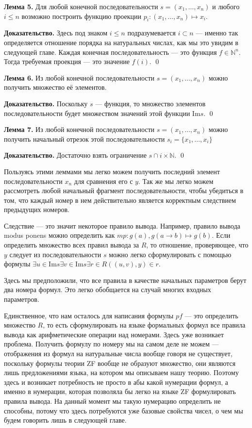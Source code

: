 {\bfseries Лемма 5.} Для любой конечной последовательности $s = (x_1, \ldots, x_n)$ и любого $i\le n$ возможно построить функцию проекции $p_i: (x_1, \dots, x_n)\mapsto x_i$.

{\bfseries Доказательство.} Здесь под знаком $i \le n$ подразумевается $i \subset n$ — именно так определяется отношение порядка на натуральных числах, как мы это увидим в следующей главе. Каждая конечная последовательность — это функция $f\in\mathbb{N}^n$. Тогда требуемая проекция — это значение $f(i)$. \qed

{\bfseries Лемма 6.} Из любой конечной последовательности $s = (x_1, \ldots, x_n)$ можно получить множество её элементов.

{\bfseries Доказательство.} Поскольку $s$ — функция, то множество элементов последовательности будет множеством значений этой функции $\mathrm{Im} s$. \qed

{\bfseries Лемма 7.} Из любой конечной последовательности $s = (x_1, \ldots, x_n)$ можно получить начальный отрезок этой последовательности $s_i = \{x_1, \ldots, x_i\}$

{\bfseries Доказательство.} Достаточно взять ограничение $s\cap i\times \mathbb{N}$. \qed

Пользуясь этими леммами мы легко можем получить последний элемент последовательности $x_n$ для сравнения его с $y$. Так же мы легко можем рассмотреть любой начальный фрагмент последовательности, чтобы убедиться в том, что каждый номер в нем действительно является корректным следствием предыдущих номеров.

Следствие — это значит некоторое правило вывода. Например, правило вывода modus ponens можно определить как $mp: g(a), g(a\rightarrow b)\mapsto g(b)$. Если определить множество всех правил вывода за $R$, то отношение, проверяющее, что $y$ следует из последовательности $s$ можно легко сформулировать с помощью формулы $\exists u\in \mathrm{Im} s \exists v \in \mathrm{Im} s \exists r\in R ((u, v), y) \in r$.

Здесь мы предположили, что все правила в качестве начальных параметров берут два номера формул. Это легко обобщается на случай многих входных параметров.

Единственное, что нам осталось для написания формулы $pf$ — это определить множество $R$, то есть сформулировать на языке формальных формул все правила вывода как арифметические операции над номерами. Здесь уже возникает проблема. Получить формулу по номеру мы на самом деле не можем — отображения из формул на натуральные числа вообще говоря не существует, поскольку формулы теории ZF вообще не образуют множество, они являются лишь предложениями языка, на котором мы описываем нашу теорию. Поэтому здесь и возникает потребность не просто в абы какой нумерации формул, а именно в нумерации, которая позволяла бы легко на языке ZF формулировать правила вывода. На данный момент мы такую нумерацию определить не способны, потому что здесь потребуются уже базовые свойства чисел, о чем мы будем говорить лишь в следующей главе.

